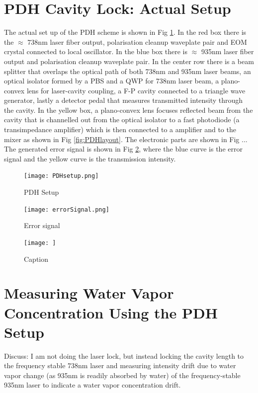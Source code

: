 \documentclass[12pt]{report}
\begin{document}
\section{PDH Cavity Lock: Actual Setup}
The actual set up of the PDH scheme is shown in Fig \ref{fig:PDHsetup}. In the red box there is the $\approx$ 738nm laser fiber output, polarisation cleanup waveplate pair and EOM crystal connected to local oscillator. In the blue box there is $\approx$ 935nm laser fiber output and polarisation cleanup waveplate pair. In the center row there is a beam splitter that overlaps the optical path of both 738nm and 935nm laser beams, an optical isolator formed by a PBS and a QWP for 738nm laser beam, a plano-convex lens for laser-cavity coupling, a F-P cavity connected to a triangle wave generator, lastly a detector pedal that measures transmitted intensity through the cavity. In the yellow box, a plano-convex lens focuses reflected beam from the cavity that is channelled out from the optical isolator to a fast photodiode (a transimpedance amplifier) which is then connected to a amplifier and to the mixer as shown in Fig \ref{fig:PDHlayout}. The electronic parts are shown in Fig ... The generated error signal is shown in Fig \ref{fig:errorSignal}, where the blue curve is the error signal and the yellow curve is the transmission intensity. 

\begin{figure}[H]
    \centering
    \texttt{[image: PDHsetup.png]}
    \caption{PDH Setup}
    \label{fig:PDHsetup}
\end{figure}

\begin{figure}[H]
    \centering
    \texttt{[image: errorSignal.png]}
    \caption{Error signal}
    \label{fig:errorSignal}
\end{figure}

\begin{figure}
    \centering
    \texttt{[image: ]}
    \caption{Caption}
    \label{fig:my_label}
\end{figure}

\section{Measuring Water Vapor Concentration Using the PDH Setup}
Discuss: I am not doing the laser lock, but instead locking the cavity length to the frequency stable 738nm laser and measuring intensity drift due to water vapor change (as 935nm is readily absorbed by water) of the frequency-stable 935nm laser to indicate a water vapor concentration drift. 
\end{document}
